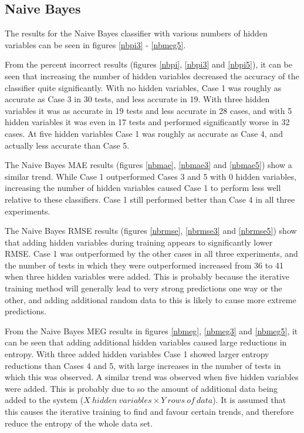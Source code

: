 \subsection{Naive Bayes}

The results for the Naive Bayes classifier with various numbers of hidden variables can be seen in figures \ref{nbpi3} - \ref{nbmeg5}.

From the percent incorrect results (figures \ref{nbpi}, \ref{nbpi3} and \ref{nbpi5}), it can be seen that increasing the number of hidden variables decreased the accuracy of the classifier quite significantly. With no hidden variables, Case 1 was roughly as accurate as Case 3 in 30 tests, and less accurate in 19. With three hidden variables it was as accurate in 19 tests and less accurate in 28 cases, and with 5 hidden variables it was even in 17 tests and performed significantly worse in 32 cases. At five hidden variables Case 1 was roughly as accurate as Case 4, and actually less accurate than Case 5.

The Naive Bayes MAE results (figures \ref{nbmae}, \ref{nbmae3} and \ref{nbmae5}) show a similar trend. While Case 1 outperformed Cases 3 and 5 with 0 hidden variables, increasing the number of hidden variables caused Case 1 to perform less well relative to these classifiers. Case 1 still performed better than Case 4 in all three experiments.

The Naive Bayes RMSE results (figures \ref{nbrmse}, \ref{nbrmse3} and \ref{nbrmse5}) show that adding hidden variables during training appears to significantly lower RMSE. Case 1 was outperformed by the other cases in all three experiments, and the number of tests in which they were outperformed increased from 36 to 41 when three hidden variables were added. This is probably because the iterative training method will generally lead to very strong predictions one way or the other, and adding additional random data to this is likely to cause more extreme predictions.

From the Naive Bayes MEG results in figures \ref{nbmeg}, \ref{nbmeg3} and \ref{nbmeg5}, it can be seen that adding additional hidden variables caused large reductions in entropy. With three added hidden variables Case 1 showed larger entropy reductions than Cases 4 and 5, with large increases in the number of tests in which this was observed. A similar trend was observed when five hidden variables were added. This is probably due to so the amount of additional data being added to the system (${X~hidden~variables}\times{Y~rows~of~data}$). It is assumed that this causes the iterative training to find and favour certain trends, and therefore reduce the entropy of the whole data set.

